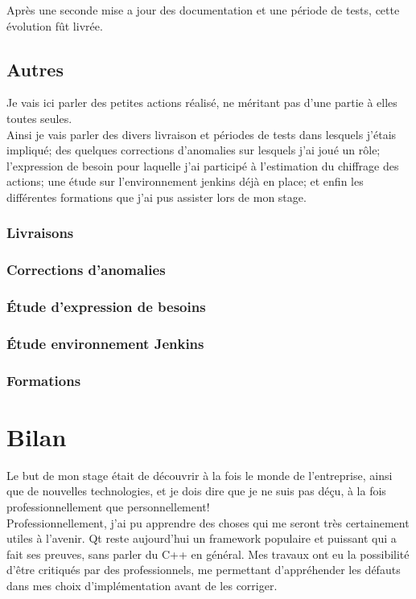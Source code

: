 \documentclass{rapport}
\begin{document}
Après une seconde mise a jour des documentation et une période de tests, cette évolution fût livrée.\\

\newpage
\subsection{Autres}
Je vais ici parler des petites actions réalisé, ne méritant pas d'une partie à elles toutes seules.\\
Ainsi je vais parler des divers livraison et périodes de tests dans lesquels j'étais impliqué; des quelques corrections d'anomalies sur lesquels j'ai joué un rôle; l'expression de besoin pour laquelle j'ai participé à l'estimation du chiffrage des actions; une étude sur l'environnement jenkins déjà en place; et enfin les différentes formations que j'ai pus assister lors de mon stage.

\subsubsection{Livraisons}
\subsubsection{Corrections d'anomalies}
\subsubsection{Étude d'expression de besoins}
\subsubsection{Étude environnement Jenkins}
\subsubsection{Formations}




\newpage
\section{Bilan}

Le but de mon stage était de découvrir à la fois le monde de l'entreprise, ainsi que de nouvelles technologies, et je dois dire que je ne suis pas déçu, à la fois professionnellement que personnellement!\\

Professionnellement, j'ai pu apprendre des choses qui me seront très certainement utiles à l'avenir. Qt reste aujourd'hui un framework populaire et puissant qui a fait ses preuves, sans parler du C++ en général. Mes travaux ont eu la possibilité d'être critiqués par des professionnels, me permettant d'appréhender les défauts dans mes choix d'implémentation avant de les corriger. \\
\end{document}

